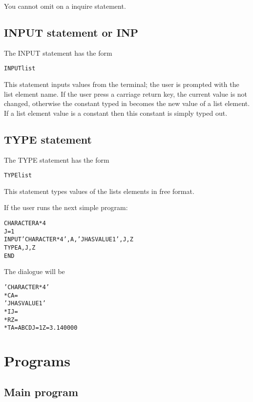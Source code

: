 You cannot omit  on a \COMIS{} inquire statement.
 
\subsection*{INPUT statement or INP}
 
The INPUT statement has the form
\begin{alltt}
     INPUT list
\end{alltt}
 
This statement inputs values from the terminal; the user is prompted
with the list element name.
If the user press a carriage return key, the current value is not
changed, otherwise the constant
typed in becomes the new value of a list element. If a list element value
is a constant then this constant is simply typed out.
 
\subsection*{TYPE statement}
 
The TYPE statement has the form
\begin{alltt}
     TYPE list
\end{alltt}
 
This statement types values of the lists elements in free format.
 
\Example
If the user runs the next simple \COMIS{} program:
\begin{alltt}
       CHARACTER A*4
       J=1
       INPUT 'CHARACTER *4',A, 'J HAS VALUE 1',J,Z
       TYPE A,J,Z
       END
\end{alltt}
The dialogue will be
 
\begin{alltt}
'CHARACTER*4'
*C  A=
'J HAS VALUE 1'
*I  J=
*R  Z=
*T  A = ABCD     J = 1     Z = 3.140000
\end{alltt}

\section{Programs}

\subsection{Main program}
\label{sec:COMISmain}
 
